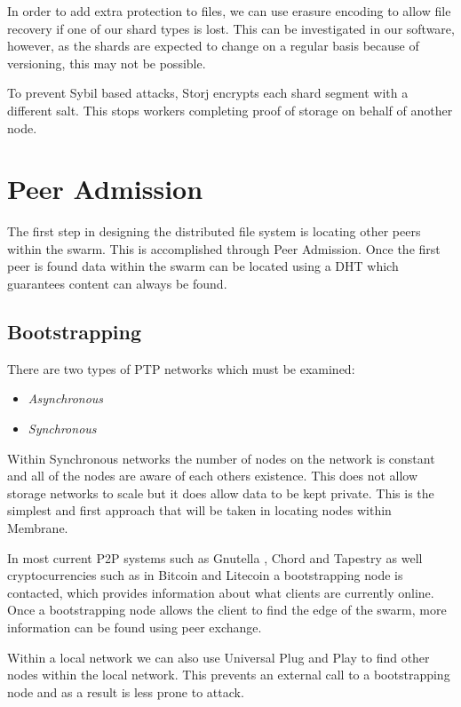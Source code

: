\documentclass[11pt, a4paper, twocolumn, twoside]{report}
\begin{document}
In order to add extra protection to files, we can use erasure encoding to allow file recovery if one of our shard types is lost. This can be investigated in our software, however, as the shards are expected to change on a regular basis because of versioning, this may not be possible.

To prevent Sybil based attacks, Storj encrypts each shard segment with a different salt. This stops workers completing proof of storage on behalf of another node.

\section{Peer Admission}
The first step in designing the distributed file system is locating other peers within the swarm. This is accomplished through Peer Admission. Once the first peer is found data within the swarm can be located using a DHT which guarantees content can always be found.

\subsection{Bootstrapping}

There are two types of PTP networks which must be examined:
\begin{itemize}
 \item \emph{Asynchronous}
 \item \emph{Synchronous}
\end{itemize}

Within Synchronous networks the number of nodes on the network is constant and all of the nodes are aware of each others existence. This does not allow storage networks to scale but it does allow data to be kept private. \citep{saxena2003admission} This is the simplest and first approach that will be taken in locating nodes within Membrane.

In most current P2P systems such as Gnutella \citep{klingberg2002gnutella}, Chord and Tapestry as well cryptocurrencies such as in Bitcoin and Litecoin a bootstrapping node is contacted, which provides information about what clients are currently online. Once a bootstrapping node allows the client to find the edge of the swarm, more information can be found using peer exchange.

Within a local network we can also use Universal Plug and Play to find other nodes within the local network. This prevents an external call to a bootstrapping node and as a result is less prone to attack.
\end{document}
